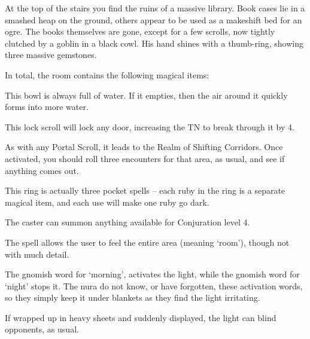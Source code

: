 \begin{multicols}{2}

\ogre


\begin{boxtext}

	At the top of the stairs you find the ruins of a massive library.
	Book cases lie in a smashed heap on the ground, others appear to be used as a makeshift bed for an ogre.
	The books themselves are gone, except for a few scrolls, now tightly clutched by a goblin in a black cowl.
	His hand shines with a thumb-ring, showing three massive gemstones.

\end{boxtext}

In total, the room contains the following magical items:


This bowl is always full of water.
If it empties, then the air around it quickly forms into more water.


This lock scroll will lock any door, increasing the TN to break through it by 4.


As with any Portal Scroll, it leads to the Realm of Shifting Corridors.
Once activated, you should roll three encounters for that area, as usual, and see if anything comes out.


This ring is actually three pocket spells -- each ruby in the ring is a separate magical item, and each use will make one ruby go dark.

The caster can summon anything available for Conjuration level 4.


The spell allows the user to feel the entire area (meaning `room'), though not with much detail.


The gnomish word for `morning', activates the light, while the gnomish word for `night' stops it.
The nura do not know, or have forgotten, these activation words, so they simply keep it under blankets as they find the light irritating.

If wrapped up in heavy sheets and suddenly displayed, the light can blind opponents, as usual.

\goblinnuramancer


\end{multicols}

